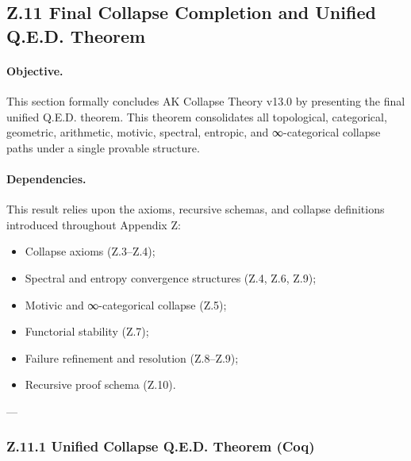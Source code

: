 \documentclass[11pt]{article}
\begin{document}
\subsection*{Z.11 Final Collapse Completion and Unified Q.E.D. Theorem}

\paragraph{Objective.}
This section formally concludes AK Collapse Theory v13.0 by presenting the final unified Q.E.D. theorem. This theorem consolidates all topological, categorical, geometric, arithmetic, motivic, spectral, entropic, and ∞-categorical collapse paths under a single provable structure.

\paragraph{Dependencies.}
This result relies upon the axioms, recursive schemas, and collapse definitions introduced throughout Appendix Z:

\begin{itemize}
    \item Collapse axioms (Z.3–Z.4);
    \item Spectral and entropy convergence structures (Z.4, Z.6, Z.9);
    \item Motivic and ∞-categorical collapse (Z.5);
    \item Functorial stability (Z.7);
    \item Failure refinement and resolution (Z.8–Z.9);
    \item Recursive proof schema (Z.10).
\end{itemize}

---

\subsubsection*{Z.11.1 Unified Collapse Q.E.D. Theorem (Coq)}
\end{document}
